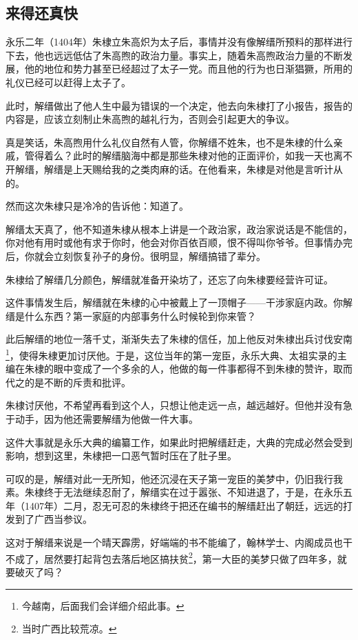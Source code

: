 \begin{multicols}{\theparacolNo}
\subsection{来得还真快}
永乐二年（1404年）朱棣立朱高炽为太子后，事情并没有像解缙所预料的那样进行下去，他也远远低估了朱高煦的政治力量。事实上，随着朱高煦政治力量的不断发展，他的地位和势力甚至已经超过了太子一党。而且他的行为也日渐猖獗，所用的礼仪已经可以赶得上太子了。

此时，解缙做出了他人生中最为错误的一个决定，他去向朱棣打了小报告，报告的内容是，应该立刻制止朱高煦的越礼行为，否则会引起更大的争议。

真是笑话，朱高煦用什么礼仪自然有人管，你解缙不姓朱，也不是朱棣的什么亲戚，管得着么？此时的解缙脑海中都是那些朱棣对他的正面评价，如我一天也离不开解缙，解缙是上天赐给我的之类肉麻的话。在他看来，朱棣是对他是言听计从的。

然而这次朱棣只是冷冷的告诉他：知道了。

解缙太天真了，他不知道朱棣从根本上讲是一个政治家，政治家说话是不能信的，你对他有用时或他有求于你时，他会对你百依百顺，恨不得叫你爷爷。但事情办完后，你就会立刻恢复孙子的身份。很明显，解缙搞错了辈分。

朱棣给了解缙几分颜色，解缙就准备开染坊了，还忘了向朱棣要经营许可证。

这件事情发生后，解缙就在朱棣的心中被戴上了一顶帽子——干涉家庭内政。你解缙是什么东西？第一家庭的内部事务什么时候轮到你来管？

此后解缙的地位一落千丈，渐渐失去了朱棣的信任，加上他反对朱棣出兵讨伐安南\footnote{今越南，后面我们会详细介绍此事。}，使得朱棣更加讨厌他。于是，这位当年的第一宠臣，永乐大典、太祖实录的主编在朱棣的眼中变成了一个多余的人，他做的每一件事都得不到朱棣的赞许，取而代之的是不断的斥责和批评。

朱棣讨厌他，不希望再看到这个人，只想让他走远一点，越远越好。但他并没有急于动手，因为他还需要解缙为他做一件大事。

这件大事就是永乐大典的编纂工作，如果此时把解缙赶走，大典的完成必然会受到影响，想到这里，朱棣把一口恶气暂时压在了肚子里。

可叹的是，解缙对此一无所知，他还沉浸在天子第一宠臣的美梦中，仍旧我行我素。朱棣终于无法继续忍耐了，解缙实在过于嚣张、不知进退了，于是，在永乐五年（1407年）二月，忍无可忍的朱棣终于把还在编书的解缙赶出了朝廷，远远的打发到了广西当参议。

这对于解缙来说是一个晴天霹雳，好端端的书不能编了，翰林学士、内阁成员也干不成了，居然要打起背包去落后地区搞扶贫\footnote{当时广西比较荒凉。}，第一大臣的美梦只做了四年多，就要破灭了吗？


\end{multicols}
